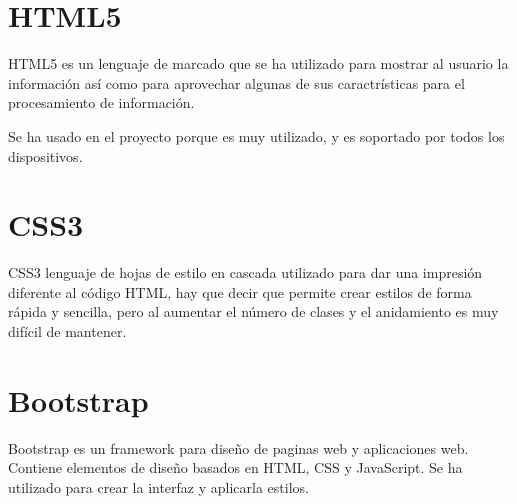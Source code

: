 \section{HTML5}\label{HTML5}

HTML5 es un lenguaje de marcado que se ha utilizado para mostrar al usuario la información así como para aprovechar algunas de sus caractrísticas para el procesamiento de información.

Se ha usado en el proyecto porque es muy utilizado, y es soportado por todos los dispositivos.

\section{CSS3}\label{CSS3}

CSS3 lenguaje de hojas de estilo en cascada utilizado para dar una impresión diferente al código HTML, hay que decir que permite crear estilos de forma rápida y sencilla, pero al aumentar el número de clases y el anidamiento es muy difícil de mantener. 
 
\section{Bootstrap}\label{bootstrap}

Bootstrap es un framework para diseño de paginas web y aplicaciones web. Contiene elementos de diseño basados en HTML, CSS y JavaScript. Se ha utilizado para crear la interfaz y aplicarla estilos. 

